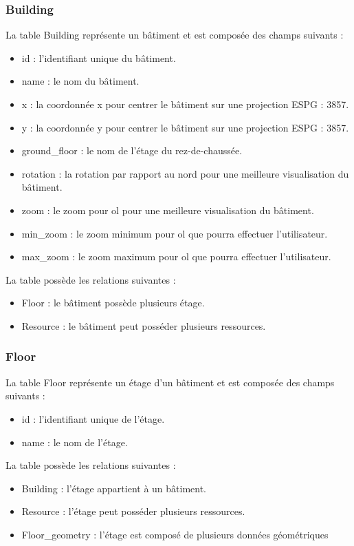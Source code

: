 \documentclass[
    iai, %
    il, %
]{heig-tb}
\begin{document}
\subsubsection{Building}
La table Building représente un bâtiment et est composée des champs suivants :

\begin{itemize}
    \item id : l'identifiant unique du bâtiment.
    \item name : le nom du bâtiment.
    \item x : la coordonnée x pour centrer le bâtiment sur une projection ESPG : 3857.
    \item y : la coordonnée y pour centrer le bâtiment sur une projection ESPG : 3857.
    \item ground\_floor : le nom de l'étage du rez-de-chaussée.
    \item rotation : la rotation par rapport au nord pour une meilleure visualisation du bâtiment.
    \item zoom : le zoom pour \gls{ol} pour une meilleure visualisation du bâtiment.
    \item min\_zoom : le zoom minimum pour \gls{ol} que pourra effectuer l'utilisateur.
    \item max\_zoom : le zoom maximum pour \gls{ol} que pourra effectuer l'utilisateur.
\end{itemize}

La table possède les relations suivantes :
\begin{itemize}
    \item Floor : le bâtiment possède plusieurs étage.
    \item Resource : le bâtiment peut posséder plusieurs ressources.
\end{itemize}

\subsubsection{Floor}
La table Floor représente un étage d'un bâtiment et est composée des champs suivants :

\begin{itemize}
    \item id : l'identifiant unique de l'étage.
    \item name : le nom de l'étage.
\end{itemize}

La table possède les relations suivantes :
\begin{itemize}
    \item Building : l'étage appartient à un bâtiment.
    \item Resource : l'étage peut posséder plusieurs ressources.
    \item Floor\_geometry : l'étage est composé de plusieurs données géométriques
\end{itemize}
\end{document}
